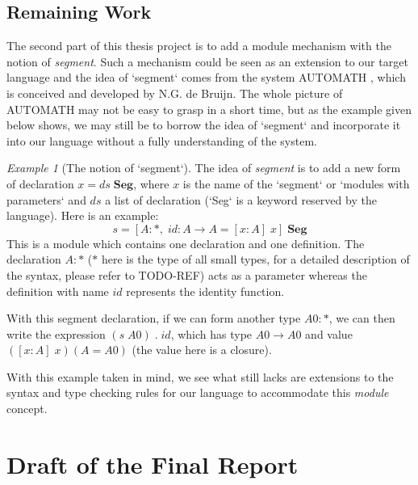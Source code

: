 \documentclass{article}
\theoremstyle{remark}
\newtheorem{example}{Example}[section]
\begin{document}
\subsection{Remaining Work}
The second part of this thesis project is to add a module mechanism with the notion of \emph{segment}. Such a mechanism could be seen as an extension to our target language and the idea of `segment` comes from the system AUTOMATH \cite{de1994survey}, which is conceived and developed by N.G. de Bruijn. The whole picture of AUTOMATH may not be easy to grasp in a short time, but as the example given below shows, we may still be to borrow the idea of `segment` and incorporate it into our language without a fully understanding of the system.
\begin{example}[The notion of `segment`]
  The idea of \emph{segment} is to add a new form of declaration $x = ds\; \textbf{Seg}$, where $x$ is the name of the `segment` or `modules with parameters` and $ds$ a list of declaration (`Seg` is a keyword reserved by the language). Here is an example:
  \[ s = [ A : *,\; id : A \to A = [x : A]\; x ]\; \textbf{Seg} \]
  This is a module which contains one declaration and one definition. The declaration \( A : * \) ($*$ here is the type of all small types, for a detailed description of the syntax, please refer to TODO-REF) acts as a parameter whereas the definition with name $id$ represents the identity function.

  With this segment declaration, if we can form another type \( A0 : * \), we can then write the expression \( (s \; A0) \; . \; id \), which has type $A0 \to A0$ and value $([x : A]\; x) (A = A0)$ (the value here is a closure).
\end{example}

With this example taken in mind, we see what still lacks are extensions to the syntax and type checking rules for our language to accommodate this \emph{module} concept. 

\section{Draft of the Final Report}
\end{document}
